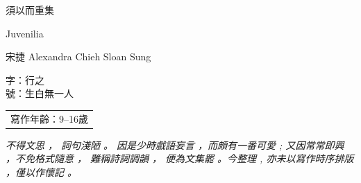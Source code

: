 \documentclass{ctexart}
\begin{document}
	\begin{titlepage}
		\thispagestyle{empty}
		\centering
		
		\vspace*{3.0cm}
		
		{\Large 須以而重集\par}
		\vspace{0.4cm}
		{\Large Juvenilia\par}
		
		\vspace{1.6cm}
		
		{\normalsize 宋捷 Alexandra Chieh Sloan Sung \par}
		\vspace{0.4cm}
		{\normalsize 字：行之\\號：生白無一人\par}
		
		\vspace{1.5cm}
		
		\begin{tabular}{c}
			
			{\large 寫作年齡：9--16歲\par}
		\end{tabular}
		
		\vfill
		
	\end{titlepage}
	
	\begin{titlepage}
		\thispagestyle{empty}
		\centering
		\vspace*{2.2cm}
		
		\begingroup
		\setlength{\parindent}{0pt}
		\setlength{\parskip}{0pt}
		
		\begin{minipage}{0.88\textwidth}
			{\large \itshape
				不得文思 ， 詞句淺陋 。 因是少時戲語妄言 ，而頗有一番可愛 ; 又因常常即興 ，不免格式隨意 ， 難稱詩詞調韻 ， 便為文集罷 。今整理 , 亦未以寫作時序排版 ，僅以作懷記 。}
		\end{minipage}
		
		\endgroup
		
		\vfill
	\end{titlepage}
	
\end{document}
